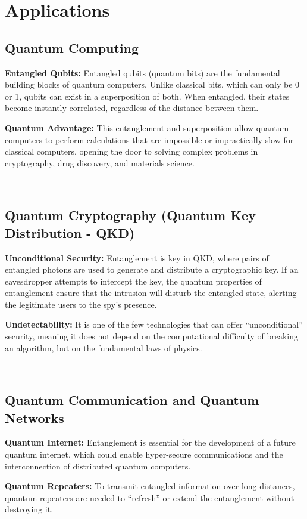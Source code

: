 \section{Applications}

\subsection{Quantum Computing}

\textbf{Entangled Qubits:} Entangled qubits (quantum bits) are the fundamental building blocks of quantum computers. Unlike classical bits, which can only be 0 or 1,
qubits can exist in a superposition of both. When entangled, their states become instantly correlated, regardless of the distance between them.

\textbf{Quantum Advantage:} This entanglement and superposition allow quantum computers to perform calculations that are impossible or impractically slow for classical 
computers, opening the door to solving complex problems in cryptography, drug discovery, and materials science.

---
\subsection{Quantum Cryptography (Quantum Key Distribution - QKD)}

\textbf{Unconditional Security:} Entanglement is key in QKD, where pairs of entangled photons are used to generate and distribute a cryptographic key. If an eavesdropper 
attempts to intercept the key, the quantum properties of entanglement ensure that the intrusion will disturb the entangled state, alerting the legitimate users to the spy's presence.

\textbf{Undetectability:} It is one of the few technologies that can offer ``unconditional'' security, meaning it does not depend on the computational difficulty of breaking 
an algorithm, but on the fundamental laws of physics.

---
\subsection{Quantum Communication and Quantum Networks}

\textbf{Quantum Internet:} Entanglement is essential for the development of a future quantum internet, which could enable hyper-secure communications and the interconnection of 
distributed quantum computers.

\textbf{Quantum Repeaters:} To transmit entangled information over long distances, quantum repeaters are needed to ``refresh'' or extend the entanglement without destroying it.

